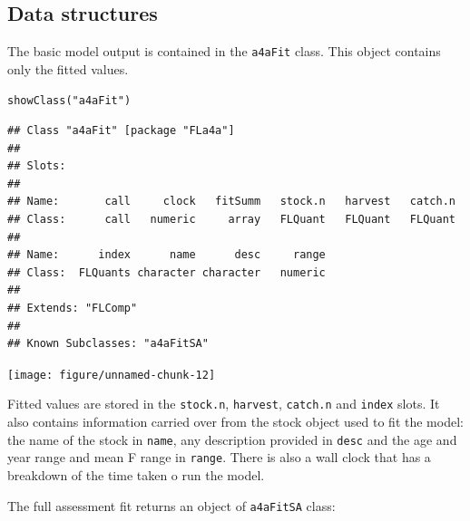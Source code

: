 \documentclass[a4paper,english,10pt]{article}\usepackage[]{graphicx}\usepackage[]{color}
\makeatletter
\newcommand{\hlstr}[1]{\textcolor[rgb]{0.2,0.2,0.2}{#1}}%
\newcommand{\hlstd}[1]{\textcolor[rgb]{0,0,0}{#1}}%
\newcommand{\hlkwd}[1]{\textcolor[rgb]{0.361,0.506,0.596}{#1}}%
\newenvironment{kframe}{%
 \def\at@end@of@kframe{}%
 \ifinner\ifhmode%
  \def\at@end@of@kframe{\end{minipage}}%
  \begin{minipage}{\columnwidth}%
 \fi\fi%
 \def\FrameCommand##1{\hskip\@totalleftmargin \hskip-\fboxsep
 \colorbox{shadecolor}{##1}\hskip-\fboxsep
     \hskip-\linewidth \hskip-\@totalleftmargin \hskip\columnwidth}%
 \MakeFramed {\advance\hsize-\width
   \@totalleftmargin\z@ \linewidth\hsize
   \@setminipage}}%
 {\par\unskip\endMakeFramed%
 \at@end@of@kframe}
\newenvironment{knitrout}{}{} %
\makeatother
\begin{document}
\subsection{Data structures}

The basic model output is contained in the \texttt{a4aFit} class. This object contains only the fitted values.

\begin{knitrout}
\color{fgcolor}\begin{kframe}
\begin{alltt}
\hlkwd{showClass}\hlstd{(}\hlstr{"a4aFit"}\hlstd{)}
\end{alltt}
\begin{verbatim}
## Class "a4aFit" [package "FLa4a"]
## 
## Slots:
##                                                                   
## Name:       call     clock   fitSumm   stock.n   harvest   catch.n
## Class:      call   numeric     array   FLQuant   FLQuant   FLQuant
##                                               
## Name:      index      name      desc     range
## Class:  FLQuants character character   numeric
## 
## Extends: "FLComp"
## 
## Known Subclasses: "a4aFitSA"
\end{verbatim}
\end{kframe}
\end{knitrout}


\begin{knitrout}
\color{fgcolor}

{\centering \texttt{[image: figure/unnamed-chunk-12]} 

}



\end{knitrout}


Fitted values are stored in the \texttt{stock.n}, \texttt{harvest}, \texttt{catch.n} and \texttt{index} slots.  It also contains information carried over from the stock object used to fit the model: the name of the stock in \texttt{name}, any description provided in \texttt{desc} and the age and year range and mean F range in \texttt{range}.  There is also a wall clock that has a breakdown of the time taken o run the model.

The full assessment fit returns an object of \texttt{a4aFitSA} class:
\end{document}
